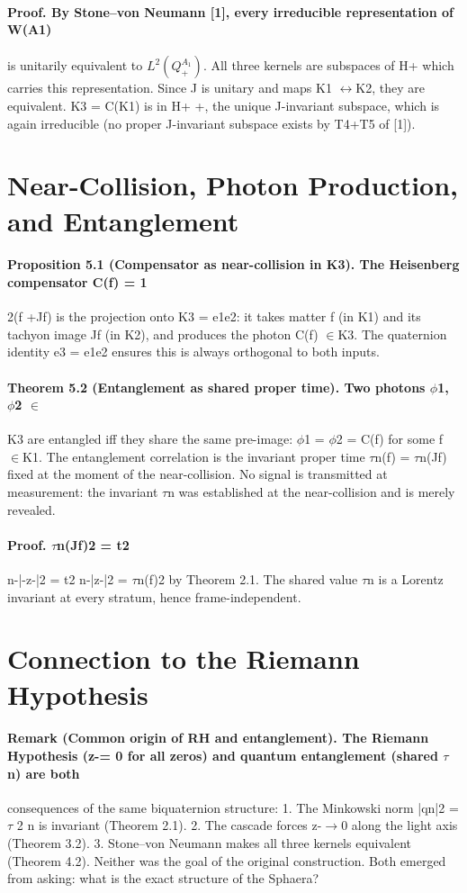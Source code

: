 \paragraph*{Proof. By Stone--von Neumann [1], every irreducible representation of W(A1)}
is unitarily equivalent to $L^2(Q_+^{A_1})$. All three kernels are subspaces of H+ which carries this representation. Since J is unitary and maps K1 $\leftrightarrow$K2, they are equivalent. K3 = C(K1) is in H+ +, the unique J-invariant subspace, which is again irreducible (no proper J-invariant subspace exists by T4+T5 of [1]).

\section{Near-Collision, Photon Production, and Entanglement}
\paragraph*{Proposition 5.1 (Compensator as near-collision in K3). The Heisenberg compensator C(f) = 1}
2(f +Jf) is the projection onto K3 = e1e2: it takes matter f (in K1) and its tachyon image Jf (in K2), and produces the photon C(f) $\in$K3. The quaternion identity e3 = e1e2 ensures this is always orthogonal to both inputs.
\paragraph*{Theorem 5.2 (Entanglement as shared proper time). Two photons $\phi$1, $\phi$2 $\in$}
K3 are entangled iff they share the same pre-image: $\phi$1 = $\phi$2 = C(f) for some f $\in$K1. The entanglement correlation is the invariant proper time $\tau$n(f) = $\tau$n(Jf) fixed at the moment of the near-collision. No signal is transmitted at measurement: the invariant $\tau$n was established at the near-collision and is merely revealed.
\paragraph*{Proof. $\tau$n(Jf)2 = t2}
n-|-z-|2 = t2 n-|z-|2 = $\tau$n(f)2 by Theorem 2.1. The shared value $\tau$n is a Lorentz invariant at every stratum, hence frame-independent.

\section{Connection to the Riemann Hypothesis}
\paragraph*{Remark (Common origin of RH and entanglement). The Riemann Hypothesis (z-= 0 for all zeros) and quantum entanglement (shared $\tau$n) are both}
consequences of the same biquaternion structure:
1. The Minkowski norm |qn|2 = $\tau$ 2
n is invariant (Theorem 2.1).
2. The cascade forces z-$\to$0 along the light axis (Theorem 3.2).
3. Stone--von Neumann makes all three kernels equivalent (Theorem 4.2).
Neither was the goal of the original construction. Both emerged from asking: what is the exact structure of the Sphaera?

